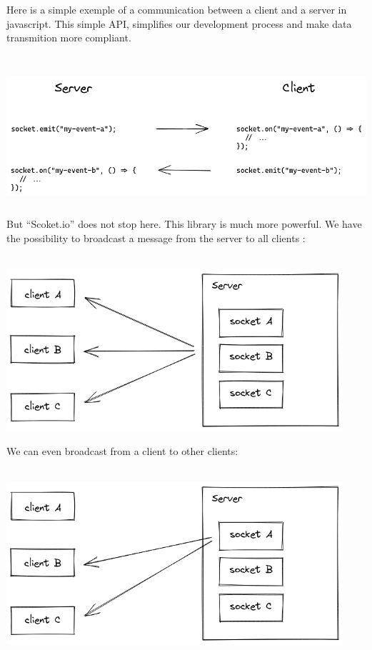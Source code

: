 \documentclass[12pt]{article}
\begin{document}
\newpage

Here is a simple exemple of a communication between a client and a server in javascript. This simple API, simplifies our development process and make data transmition more compliant. \\ \\
\centerline{\includegraphics[height=5cm]{../../docs/server-client.png}}

But “Scoket.io” does not stop here. This library is much more powerful. We have the possibility to broadcast a message from the server to all clients : \\ \\
\centerline{\includegraphics[height=6cm]{../../docs/broadcast-0.png}}

We can even broadcast from a client to other clients: \\ \\
\centerline{\includegraphics[height=6cm]{../../docs/broadcast-1.png}}
\end{document}

